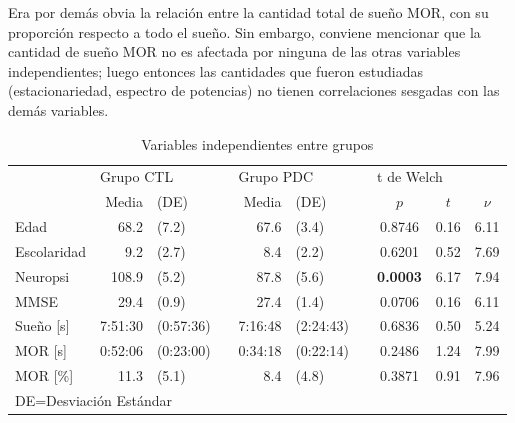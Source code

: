 Era por demás obvia la relación entre la cantidad total de sueño MOR, con su proporción respecto a 
todo el sueño. Sin embargo, conviene mencionar que la cantidad de sueño MOR no es afectada por
ninguna de las otras variables independientes; luego entonces las cantidades que fueron estudiadas
(estacionariedad, espectro de potencias) no tienen correlaciones sesgadas con las demás variables.

\begin{table}
\centering
\caption{Variables independientes entre grupos}
\begin{tabular}{lrlcrlcccc}
\toprule
 & \multicolumn{2}{l}{Grupo CTL} & \phantom{.} & \multicolumn{2}{l}{Grupo PDC} 
 & \phantom{.} & \multicolumn{3}{l}{t de Welch}
 \\
\cmidrule{2-3} \cmidrule{5-6} \cmidrule{8-10}
& Media & (DE) & & Media & (DE) & & $p$ & $t$ & $\nu$ \\
\midrule
Edad              &  68.2   & (7.2)     & &    67.6 & (3.4)     & & 0.8746 & 0.16 & 6.11 \\
Escolaridad       &   9.2   & (2.7)     & &     8.4 & (2.2)     & & 0.6201 & 0.52 & 7.69 \\
Neuropsi          & 108.9   & (5.2)     & &    87.8 & (5.6)     & & \bf 0.0003 & 6.17 & 7.94 \\
MMSE              &  29.4   & (0.9)     & &    27.4 & (1.4)     & & 0.0706 & 0.16 & 6.11 \\
Sueño [s]         & 7:51:30 & (0:57:36) & & 7:16:48 & (2:24:43) & & 0.6836 & 0.50 & 5.24 \\
MOR [s]           & 0:52:06 & (0:23:00) & & 0:34:18 & (0:22:14) & & 0.2486 & 1.24 & 7.99 \\
MOR [\%]          &  11.3   & (5.1)     & &     8.4 & (4.8)     & & 0.3871 & 0.91 & 7.96 \\
\bottomrule 
\multicolumn{5}{l}{DE=Desviación Estándar}
\end{tabular} 
\label{var_ind}
\end{table}

